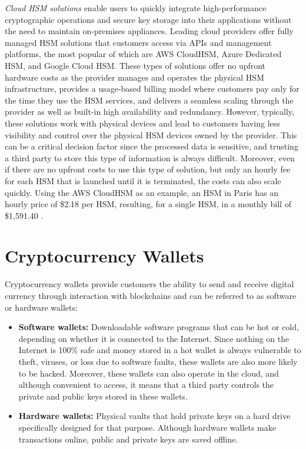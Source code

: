 \textit{Cloud HSM solutions} \cite{physicalvscloudhsm} enable users to quickly integrate high-performance cryptographic operations and secure key storage into their applications without the need to maintain on-premises appliances. Leading cloud providers offer fully managed HSM solutions that customers access via APIs and management platforms, the most popular of which are AWS CloudHSM, Azure Dedicated HSM, and Google Cloud HSM. These types of solutions offer no upfront hardware costs as the provider manages and operates the physical HSM infrastructure, provides a usage-based billing model where customers pay only for the time they use the HSM services, and delivers a seamless scaling through the provider as well as built-in high availability and redundancy. However, typically, these solutions work with physical devices and lead to customers having less visibility and control over the physical HSM devices owned by the provider. This can be a critical decision factor since the processed data is sensitive, and trusting a third party to store this type of information is always difficult. Moreover, even if there are no upfront costs to use this type of solution, but only an hourly fee for each HSM that is launched until it is terminated, the costs can also scale quickly. Using the AWS CloudHSM as an example, an HSM in Paris has an hourly price of \$2.18 per HSM, resulting, for a single HSM, in a monthly bill of \$1,591.40 \cite{awscloudhsmpricing}.


\section{Cryptocurrency Wallets} \label{sec:crypto-wallets}

Cryptocurrency wallets \cite{cryptowalletreview} provide customers the ability to send and receive digital currency through interaction with blockchains and can be referred to as software or hardware wallets:
\begin{itemize}
    \item \textbf{Software wallets:} Downloadable software programs that can be hot or cold, depending on whether it is connected to the Internet. Since nothing on the Internet is 100\% safe and money stored in a hot wallet is always vulnerable to theft, viruses, or loss due to software faults, these wallets are also more likely to be hacked. Moreover, these wallets can also operate in the cloud, and although convenient to access, it means that a third party controls the private and public keys stored in these wallets.
    \item \textbf{Hardware wallets:} Physical vaults that hold private keys on a hard drive specifically designed for that purpose. Although hardware wallets make transactions online, public and private keys are saved offline. 
\end{itemize}

